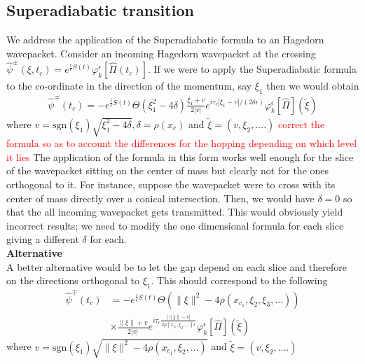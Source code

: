 \documentclass[12pt]{article}
\numberwithin{equation}{section}
\begin{document}
      \subsection{Superadiabatic transition}
      We address the application of the Superadiabatic formula to an Hagedorn 
      wavepacket. Consider an incoming Hagedorn wavepacket 
      at the crossing 
      $\hat{\psi}^{\pm}(\xi,t_c) 
      = 
      e^{\frac{i}{\epsilon}S(t)}
      \varphi_{k}^\epsilon[\hat{\Pi}(t_c)]$. If we were to apply the 
      Superadiabatic formula to the co-ordinate in the direction of the 
      momentum, say $\xi_1$ then we would obtain 
      \begin{equation}
        \begin{split}
          \hat{\psi}^{\mp}(t_c)
          =
          - e^{\frac{i}{\epsilon}S(t)}
          \Theta(\xi_1^2 - 4 \delta)
          \frac{\xi_1 + v }{2 |v|} 
          e^{i \tau_c |\xi_1 - v| / (2  \delta \epsilon)}
            \varphi_{k}^\epsilon[\hat{\Pi}](\tilde{\xi})  
        \end{split}
      \end{equation}
      where $v = \text{sgn}(\xi_1) \sqrt{\xi_1^2 - 4 \delta}, 
      \delta = \rho(x_c)$ and $\tilde{\xi} = (v, \xi_2, ....)$
      \textcolor{red}{correct the formula so as to account the differences for 
      the hopping depending on which level it lies}
      The application of the formula in this form works well enough for the slice 
      of the wavepacket sitting on the center of mass but clearly not for the ones 
      orthogonal to it. For instance, suppose the wavepacket were to cross 
      with its center of mass directly over a conical intersection. Then, we would 
      have $\delta=0$ so that the all incoming wavepacket gets transmitted. This would 
      obviously yield incorrect results; we need to modify the one dimensional 
      formula for each slice giving a different $\delta$ for each. 
      \\
      \textbf{Alternative}
      \\
      A better alternative would be to let the gap depend on each slice and therefore 
      on the directions orthogonal to $\xi_1$. This should correspond to the 
      following
      \begin{equation}
        \begin{split}
          \hat{\psi}^{\mp}(t_c)
          &=
          - e^{\frac{i}{\epsilon}S(t)}
          \Theta(\| \xi \|^2 - 4 \rho(x_{c_1}, \xi_2, \xi_3, ...)) 
          \\
          &
          \times
          \frac{\|\xi\| + v }{2 |v|} 
          e^{i \tau_c \frac{| \| \xi \| - v|}{2  \rho(x_{c_1}, \xi_2, ...) \epsilon}}
            \varphi_{k}^\epsilon[\hat{\Pi}](\tilde{\xi})  
        \end{split}
      \end{equation}
      where $v = \text{sgn}(\xi_1) \sqrt{ \| \xi \|^2 - 4 \rho(x_{c_1}, \xi_2, ...)}$
       and $\tilde{\xi} = (v, \xi_2, ....)$
        
\end{document}
